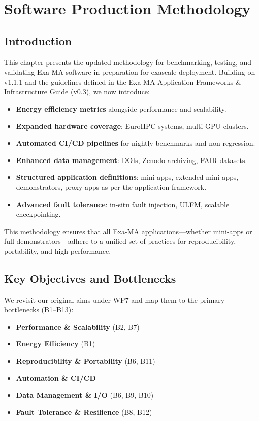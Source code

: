 
\chapter{Software Production Methodology}
\label{chap:methodology}

\section{Introduction}
This chapter presents the updated methodology for benchmarking, testing, and validating Exa-MA software in preparation for exascale deployment. Building on v1.1.1 and the guidelines defined in the Exa-MA Application Frameworks \& Infrastructure Guide (v0.3), we now introduce:

\begin{itemize}
  \item \textbf{Energy efficiency metrics} alongside performance and scalability.
  \item \textbf{Expanded hardware coverage}: EuroHPC systems, multi-GPU clusters.
  \item \textbf{Automated CI/CD pipelines} for nightly benchmarks and non-regression.
  \item \textbf{Enhanced data management}: DOIs, Zenodo archiving, FAIR datasets.
  \item \textbf{Structured application definitions}: mini-apps, extended mini-apps, demonstrators, proxy-apps as per the application framework.
  \item \textbf{Advanced fault tolerance}: in-situ fault injection, ULFM, scalable checkpointing.
\end{itemize}

This methodology ensures that all Exa-MA applications—whether mini-apps or full demonstrators—adhere to a unified set of practices for reproducibility, portability, and high performance.

\section{Key Objectives and Bottlenecks}
We revisit our original aims under WP7 and map them to the primary bottlenecks (B1–B13):

\begin{itemize}
  \item \textbf{Performance \& Scalability} (B2, B7)
  \item \textbf{Energy Efficiency} (B1)
  \item \textbf{Reproducibility \& Portability} (B6, B11)
  \item \textbf{Automation \& CI/CD}
  \item \textbf{Data Management \& I/O} (B6, B9, B10)
  \item \textbf{Fault Tolerance \& Resilience} (B8, B12)
\end{itemize}

